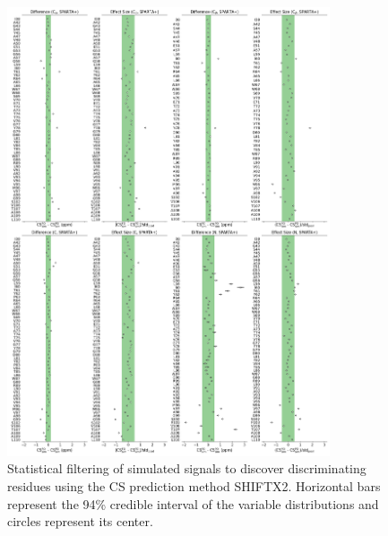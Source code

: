 \documentclass[%
 aip,
 amsmath,amssymb,
 preprint,%
]{revtex4-1}
\begin{document}
\begin{figure}[tbp]
	\includegraphics[width=0.85\textwidth]{figures_SI/statistical_filtering_skew_model_shiftx2_all.png}
	 \caption{\scriptsize
 Statistical filtering of simulated signals to discover discriminating residues using the CS prediction method SHIFTX2. Horizontal bars represent the 94\% credible interval of the variable distributions and circles represent its center.
}
\label{SI_stat_filt_2}
\end{figure}
\end{document}
